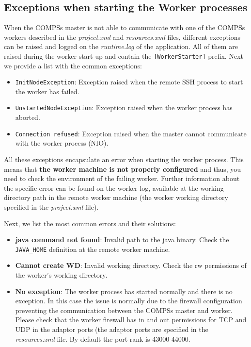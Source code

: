 \subsection{Exceptions when starting the Worker processes}

When the COMPSs master is not able to communicate with one of the COMPSs workers described in the \textit{project.xml} and 
\textit{resources.xml} files, different exceptions can be raised and logged on the \textit{runtime.log} of the application. All of
them are raised during the worker start up and contain the \texttt{[WorkerStarter]} prefix. Next we provide a list with the common
exceptions:

\begin{itemize}
 \item \texttt{InitNodeException}: Exception raised when the remote SSH process to start the worker has failed.
 \item \texttt{UnstartedNodeException}: Exception raised when the worker process has aborted.
 \item \texttt{Connection refused}: Exception raised when the master cannot communicate with the worker process (NIO).
\end{itemize}

All these exceptions encapsulate an error when starting the worker process. This means that \textbf{the worker machine is not properly configured} and thus,
you need to check the environment of the failing worker. Further information about the specific error can be found on the worker log,
available at the working directory path in the remote worker machine (the worker working directory specified in the \textit{project.xml}
file). 

Next, we list the most common errors and their solutions:

\begin{itemize}
 \item \textbf{java command not found}: Invalid path to the java binary. Check the \texttt{JAVA\_HOME} definition at the remote worker machine. 
 \item \textbf{Cannot create WD}: Invalid working directory. Check the rw permissions of the worker's working directory.
 \item \textbf{No exception}: The worker process has started normally and there is no exception. In this case the issue is normally due to the
 firewall configuration preventing the communication between the COMPSs master and worker. Please check that the worker firewall has in and out
 permissions for TCP and UDP in the adaptor ports (the adaptor ports are specified in the \textit{resources.xml} file. By default the port rank
 is 43000-44000.
\end{itemize}


